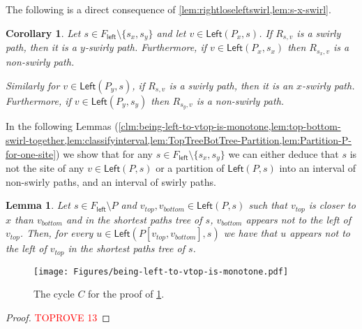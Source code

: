 \documentclass{article}
\newcommand{\Left}{\mathsf{Left}}
\newcommand{\leftside}{\mathsf{left}}
\newtheorem{lemma}{Lemma}
\newtheorem{corollary}{Corollary}
\begin{document}
The following is a direct consequence of \cref{lem:rightloseleftswirl,lem:s-x-swirl}.

\begin{corollary}\label{cor:Px-not-x-swirly}
Let $s\in F_{\leftside}\setminus\{s_x,s_y\}$ and let $v\in \Left(P_x,s)$.
If $R_{s,v}$ is a swirly path, then it is a $y$-swirly path.
Furthermore, if $v\in \Left(P_x,s_x)$ then $R_{s_x,v}$ is a non-swirly path.

Similarly for $v\in \Left(P_y,s)$, if $R_{s,v}$ is a swirly path, then it is an $x$-swirly path.
Furthermore, if $v\in \Left(P_y,s_y)$ then $R_{s_y,v}$ is a non-swirly path.
\end{corollary}




















In the following Lemmas (\cref{clm:being-left-to-vtop-is-monotone,lem:top-bottom-swirl-together,lem:classifyinterval,lem:TopTreeBotTree-Partition,lem:Partition-P-for-one-site}) we show that for any $s\in F_{\leftside}\setminus\{s_x,s_y\}$ we can either deduce that $s$ is not the site of any $v\in\Left(P,s)$ or a partition of $\Left(P,s)$ into an interval of non-swirly paths, and an interval of swirly paths.

\begin{lemma}\label{clm:being-left-to-vtop-is-monotone}
    Let $s\in F_{\leftside}\setminus P$ and $v_{top},v_{bottom}\in \Left(P,s)$ such that $v_{top}$ is closer to $x$ than $v_{bottom}$ and in the shortest paths tree of $s$, $v_{bottom}$ appears not to the left of $v_{top}$.
    Then, for every $u\in \Left(P[v_{top},v_{bottom}],s)$ we have that $u$ appears not to the left of $v_{top}$ in the shortest paths tree of $s$.
\end{lemma}
\begin{figure}[ht]
    \centering
    \texttt{[image: Figures/being-left-to-vtop-is-monotone.pdf]}
    \caption{The cycle $C$ for the proof of \cref{clm:being-left-to-vtop-is-monotone}.}
    \label{fig:being-left-to-vtop-is-monotone}
\end{figure}
\begin{proof}\textcolor{red}{TOPROVE 13}\end{proof}
\end{document}
